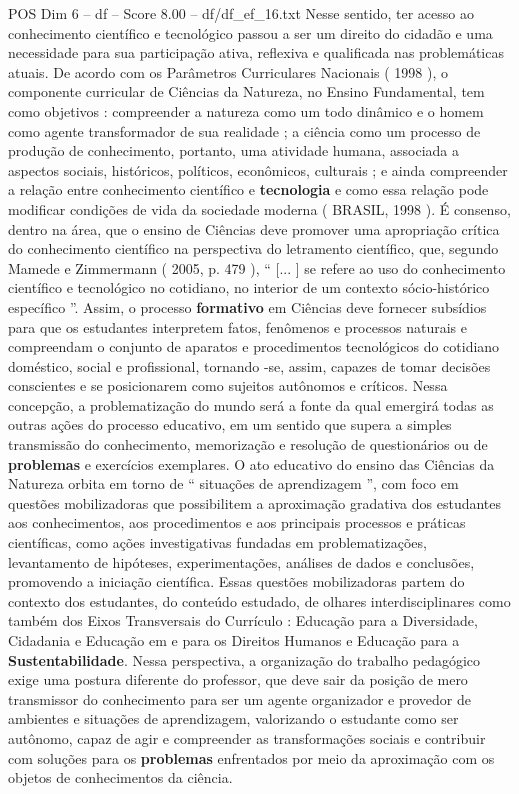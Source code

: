 \begin{textsample}{POS Dim 6 – df – Score 8.00 – df/df\_ef\_16.txt}
Nesse sentido, ter acesso ao conhecimento científico e tecnológico passou a ser um direito do cidadão e uma necessidade para sua participação ativa, reflexiva e qualificada nas problemáticas atuais.
De acordo com os Parâmetros Curriculares Nacionais ( 1998 ), o componente curricular de Ciências da Natureza, no Ensino Fundamental, tem como objetivos : compreender a natureza como um todo dinâmico e o homem como agente transformador de sua realidade ; a ciência como um processo de produção de conhecimento, portanto, uma atividade humana, associada a aspectos sociais, históricos, políticos, econômicos, culturais ; e ainda compreender a relação entre conhecimento científico e \textbf{tecnologia} e como essa relação pode modificar condições de vida da sociedade moderna ( BRASIL, 1998 ).
É consenso, dentro na área, que o ensino de Ciências deve promover uma apropriação crítica do conhecimento científico na perspectiva do letramento científico, que, segundo Mamede e Zimmermann ( 2005, p. 479 ), “ [... ] se refere ao uso do conhecimento científico e tecnológico no cotidiano, no interior de um contexto sócio-histórico específico ”.
Assim, o processo \textbf{formativo} em Ciências deve fornecer subsídios para que os estudantes interpretem fatos, fenômenos e processos naturais e compreendam o conjunto de aparatos e procedimentos tecnológicos do cotidiano doméstico, social e profissional, tornando -se, assim, capazes de tomar decisões conscientes e se posicionarem como sujeitos autônomos e críticos.
Nessa concepção, a problematização do mundo será a fonte da qual emergirá todas as outras ações do processo educativo, em um sentido que supera a simples transmissão do conhecimento, memorização e resolução de questionários ou de \textbf{problemas} e exercícios exemplares.
O ato educativo do ensino das Ciências da Natureza orbita em torno de “ situações de aprendizagem ”, com foco em questões mobilizadoras que possibilitem a aproximação gradativa dos estudantes aos conhecimentos, aos procedimentos e aos principais processos e práticas científicas, como ações investigativas fundadas em problematizações, levantamento de hipóteses, experimentações, análises de dados e conclusões, promovendo a iniciação científica.
Essas questões mobilizadoras partem do contexto dos estudantes, do conteúdo estudado, de olhares interdisciplinares como também dos Eixos Transversais do Currículo : Educação para a Diversidade, Cidadania e Educação em e para os Direitos Humanos e Educação para a \textbf{Sustentabilidade}.
Nessa perspectiva, a organização do trabalho pedagógico exige uma postura diferente do professor, que deve sair da posição de mero transmissor do conhecimento para ser um agente organizador e provedor de ambientes e situações de aprendizagem, valorizando o estudante como ser autônomo, capaz de agir e compreender as transformações sociais e contribuir com soluções para os \textbf{problemas} enfrentados por meio da aproximação com os objetos de conhecimentos da ciência.

\end{textsample}
